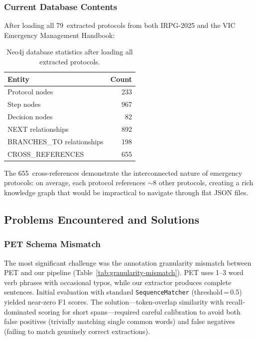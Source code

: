 \documentclass[12pt,a4paper]{article}
\begin{document}
\subsubsection{Current Database Contents}

After loading all 79~extracted protocols from both IRPG-2025 and the VIC Emergency Management Handbook:

\begin{table}[H]
\centering
\caption{Neo4j database statistics after loading all extracted protocols.}
\label{tab:neo4j-stats}
\begin{tabular}{l r}
\toprule
\textbf{Entity} & \textbf{Count} \\
\midrule
Protocol nodes       & 233 \\
Step nodes           & 967 \\
Decision nodes       & 82 \\
\midrule
NEXT relationships           & 892 \\
BRANCHES\_TO relationships   & 198 \\
CROSS\_REFERENCES            & 655 \\
\bottomrule
\end{tabular}
\end{table}

The 655~cross-references demonstrate the interconnected nature of emergency protocols: on average, each protocol references $\sim$8 other protocols, creating a rich knowledge graph that would be impractical to navigate through flat JSON files.

\subsection{Problems Encountered and Solutions}
\label{sec:problems}

\subsubsection{PET Schema Mismatch}
The most significant challenge was the annotation granularity mismatch between PET and our pipeline (Table~\ref{tab:granularity-mismatch}). PET uses 1--3 word verb phrases with occasional typos, while our extractor produces complete sentences. Initial evaluation with standard \texttt{SequenceMatcher} (threshold\,=\,0.5) yielded near-zero F1 scores. The solution---token-overlap similarity with recall-dominated scoring for short spans---required careful calibration to avoid both false positives (trivially matching single common words) and false negatives (failing to match genuinely correct extractions).
\end{document}
